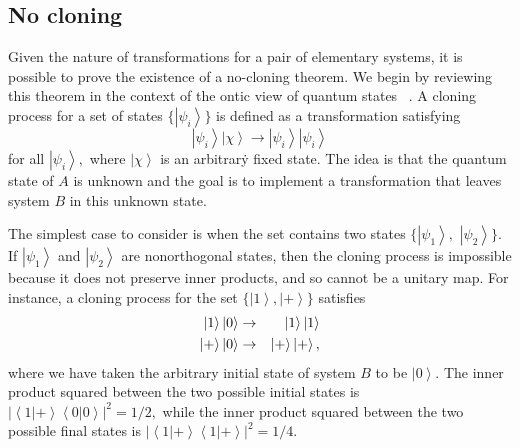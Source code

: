 \documentclass[pra,nofootinbib,showpacs,12pt]{revtex4}
\begin{document}
\subsection{No cloning}

\label{nocloning}

\strut Given the nature of transformations for a pair of
elementary systems, it is possible to prove the existence of a
no-cloning theorem. We begin by reviewing this theorem in the
context of the ontic view of quantum states~
\cite{WoottersZurek,Dieks}. A cloning process for a set of states
$\{\left| \psi _{i}\right\rangle \}$ is defined as a
transformation satisfying
\begin{equation}
\left| \psi _{i}\right\rangle \left| \chi \right\rangle \rightarrow \left|
\psi _{i}\right\rangle \left| \psi _{i}\right\rangle  \label{defncloning}
\end{equation}
for all $\left| \psi _{i}\right\rangle ,$ where $\left| \chi \right\rangle $
is an arbitrar\.{y} fixed state. The idea is that the quantum state of $A$
is unknown and the goal is to implement a transformation that leaves system $%
B$ in this unknown state.

The simplest case to consider is when the set contains two states $\{\left|
\psi _{1}\right\rangle ,$ $\left| \psi _{2}\right\rangle \}$. If $\left|
\psi _{1}\right\rangle $ and $\left| \psi _{2}\right\rangle $ are
nonorthogonal states, then the cloning process is impossible because it does
not preserve inner products, and so cannot be a unitary map. For instance, a
cloning process for the set $\{\left| 1\right\rangle ,\left| +\right\rangle
\}$ satisfies
\begin{eqnarray}
\left| 1\right\rangle \left| 0\right\rangle &\rightarrow &\left|
1\right\rangle \left| 1\right\rangle  \notag \\
\left| +\right\rangle \left| 0\right\rangle &\rightarrow &\left|
+\right\rangle \left| +\right\rangle ,
\end{eqnarray}
where we have taken the arbitrary initial state of system $B$ to be $\left|
0\right\rangle .$ The inner product squared between the two possible initial
states is $\left| \left\langle 1|+\right\rangle \left\langle
0|0\right\rangle \right| ^{2}=1/2,$ while the inner product squared between
the two possible final states is $\left| \left\langle 1|+\right\rangle
\left\langle 1|+\right\rangle \right| ^{2}=1/4.$
\end{document}
